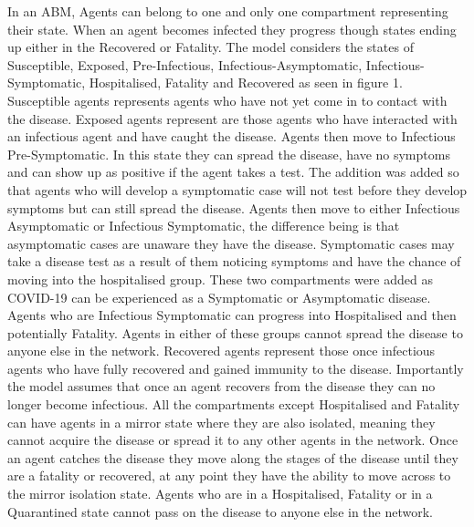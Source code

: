 \documentclass{article}
\begin{document}
In an ABM, Agents can belong to one and only one compartment representing their state. 
When an agent becomes infected they progress though states ending up either in the Recovered or Fatality. 
The model considers the states of Susceptible, Exposed, Pre-Infectious, Infectious-Asymptomatic, Infectious-Symptomatic, Hospitalised, Fatality and Recovered as seen in figure 1.
Susceptible agents represents agents who have not yet come in to contact with the disease. 
Exposed agents represent are those agents who have interacted with an infectious agent and have caught the disease.
Agents then move to Infectious Pre-Symptomatic. In this state they can spread the disease, have no symptoms and can show up as positive if the agent takes a test. The addition was added so that agents who will develop a symptomatic case will not test before they develop symptoms but can still spread the disease.
Agents then move to either Infectious Asymptomatic or Infectious Symptomatic, the difference being is that asymptomatic cases are unaware they have the disease. Symptomatic cases may take a disease test as a result of them noticing symptoms and have the chance of moving into the hospitalised group. These two compartments were added as COVID-19 can be experienced as a Symptomatic or Asymptomatic disease. Agents who are Infectious Symptomatic can progress into Hospitalised and then potentially Fatality. Agents in either of these groups cannot spread the disease to anyone else in the network.
Recovered agents represent those once infectious agents who have fully recovered and gained immunity to the disease. 
Importantly the model assumes that once an agent recovers from the disease they can no longer become infectious. \newline 
All the compartments except Hospitalised and Fatality can have agents in a mirror state where they are also isolated, meaning they cannot acquire the disease or spread it to any other agents in the network. Once an agent catches the disease they move along the stages of the disease until they are a fatality or recovered, at any point they have the ability to move across to the mirror isolation state. Agents who are in a Hospitalised, Fatality or in a Quarantined state cannot pass on the disease to anyone else in the network.
\end{document}
